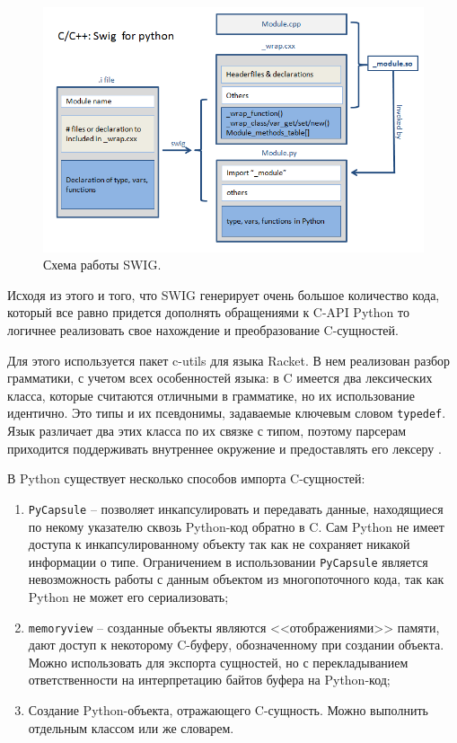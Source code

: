 \begin{figure}[!htbp]
    \centering
    \begin{adjustbox}{max totalsize={\textwidth}{\textheight}}
        \includegraphics[]{images/swig.png}
    \end{adjustbox}
    \caption{Схема работы SWIG.}\label{fig:swig}
\end{figure}

Исходя из этого и того, что SWIG генерирует очень большое количество кода,
который все равно придется дополнять обращениями к C-API Python то логичнее
реализовать свое нахождение и преобразование C-сущностей.

Для этого используется пакет c-utils \cite{c-utils} для языка Racket.
В нем реализован разбор грамматики, с учетом всех особенностей
языка: в C имеется два лексических класса, которые считаются
отличными в грамматике, но их использование идентично.
Это типы и их псевдонимы, задаваемые ключевым словом \texttt{typedef}.
Язык различает два этих класса по их связке с типом, поэтому
парсерам приходится поддерживать внутреннее окружение и предоставлять
его лексеру \cite{c-utils-internals}.

В Python существует несколько способов импорта C-сущностей:

\begin{enumerate}[label={\arabic*)}]
    \item \texttt{PyCapsule} -- позволяет инкапсулировать и передавать данные, находящиеся по некому указателю
          сквозь Python-код обратно в C. Сам Python не имеет доступа к инкапсулированному объекту
          так как не сохраняет никакой информации о типе. Ограничением в использовании \texttt{PyCapsule}
          является невозможность работы с данным объектом из многопоточного кода, так как
          Python не может его сериализовать;
    \item \texttt{memoryview} -- созданные объекты являются <<отображениями>> памяти, дают доступ
          к некоторому C-буферу, обозначенному при создании объекта. Можно использовать для
          экспорта сущностей, но с перекладыванием ответственности на интерпретацию байтов буфера
          на Python-код;
    \item Создание Python-объекта, отражающего C-сущность. Можно выполнить отдельным классом или
          же словарем.
\end{enumerate}

